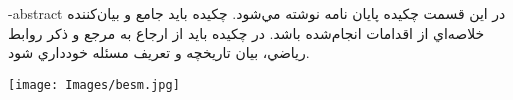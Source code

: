 
\fa-abstract{
در اين قسمت چكيده پایان نامه نوشته مي‌شو‌د‌.‌ چكيده بايد جامع و بيان‌كننده‌ خلاصه‌اي از اقدامات انجام‌شده باشد. در چكيده باید از ارجاع به مرجع و ذكر روابط رياضي، بيان تاريخچه و تعريف مسئله خودداري ‌شود. 
}





\AUTtitle
\vspace*{7cm}
\thispagestyle{empty}
\begin{center}
\texttt{[image: Images/besm.jpg]}
\end{center}
